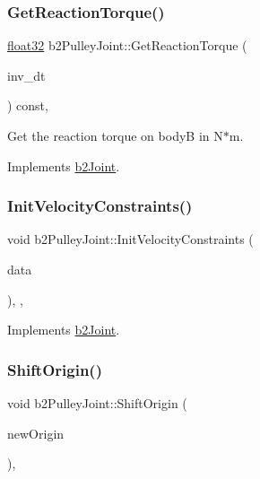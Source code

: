 \subsubsection{\texorpdfstring{GetReactionTorque()}{GetReactionTorque()}}
{\footnotesize\ttfamily \mbox{\hyperlink{b2_settings_8h_aacdc525d6f7bddb3ae95d5c311bd06a1}{float32}} b2\+Pulley\+Joint\+::\+Get\+Reaction\+Torque (\begin{DoxyParamCaption}\item[{\mbox{\hyperlink{b2_settings_8h_aacdc525d6f7bddb3ae95d5c311bd06a1}{float32}}}]{inv\+\_\+dt }\end{DoxyParamCaption}) const\hspace{0.3cm}{\ttfamily [override]}, {\ttfamily [virtual]}}



Get the reaction torque on bodyB in N$\ast$m. 



Implements \mbox{\hyperlink{classb2_joint_ae355e441c2aa842777dc04e24f15ced0}{b2\+Joint}}.

\mbox{\label{classb2_pulley_joint_a1826611f1dfe6284c3ce3afdab875e94}} 
\subsubsection{\texorpdfstring{InitVelocityConstraints()}{InitVelocityConstraints()}}
{\footnotesize\ttfamily void b2\+Pulley\+Joint\+::\+Init\+Velocity\+Constraints (\begin{DoxyParamCaption}\item[{const \mbox{\hyperlink{structb2_solver_data}{b2\+Solver\+Data}} \&}]{data }\end{DoxyParamCaption})\hspace{0.3cm}{\ttfamily [override]}, {\ttfamily [protected]}, {\ttfamily [virtual]}}



Implements \mbox{\hyperlink{classb2_joint_a599c013de5514e02684b958b31dd76a4}{b2\+Joint}}.

\mbox{\label{classb2_pulley_joint_a5a9e626c758380fe565837bedb3dc018}} 
\subsubsection{\texorpdfstring{ShiftOrigin()}{ShiftOrigin()}}
{\footnotesize\ttfamily void b2\+Pulley\+Joint\+::\+Shift\+Origin (\begin{DoxyParamCaption}\item[{const \mbox{\hyperlink{structb2_vec2}{b2\+Vec2}} \&}]{new\+Origin }\end{DoxyParamCaption})\hspace{0.3cm}{\ttfamily [override]}, {\ttfamily [virtual]}}



